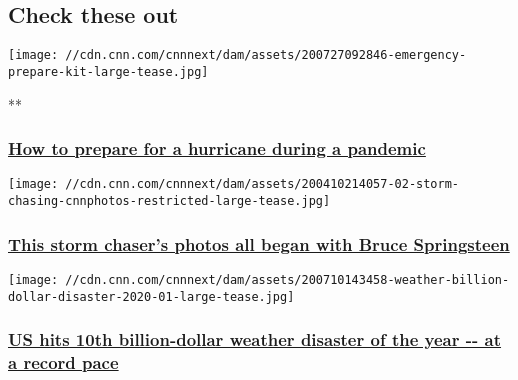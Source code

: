 \href{https://www.cnn.com/specials/weather/weather-video}{}

\hypertarget{check-these-out}{%
\subsection{Check these out}\label{check-these-out}}

\href{/videos/weather/2020/07/27/how-to-prepare-for-hurricane-during-coronavirus-pandemic-van-dillen-pkg-mxp-vpx.hln}{}

\texttt{[image: //cdn.cnn.com/cnnnext/dam/assets/200727092846-emergency-prepare-kit-large-tease.jpg]}

**

\hypertarget{how-to-prepare-for-a-hurricane-during-a-pandemic}{%
\subsubsection{\texorpdfstring{\href{/videos/weather/2020/07/27/how-to-prepare-for-hurricane-during-coronavirus-pandemic-van-dillen-pkg-mxp-vpx.hln}{How
to prepare for a hurricane during a
pandemic}}{How to prepare for a hurricane during a pandemic}}\label{how-to-prepare-for-a-hurricane-during-a-pandemic}}

\href{https://www.cnn.com/interactive/2020/04/weather/storm-chasing-eric-meola-cnnphotos/index.html}{}

\texttt{[image: //cdn.cnn.com/cnnnext/dam/assets/200410214057-02-storm-chasing-cnnphotos-restricted-large-tease.jpg]}

\hypertarget{this-storm-chasers-photos-all-began-with-bruce-springsteen}{%
\subsubsection{\texorpdfstring{\href{https://www.cnn.com/interactive/2020/04/weather/storm-chasing-eric-meola-cnnphotos/index.html}{This
storm chaser's photos all began with Bruce
Springsteen}}{This storm chaser's photos all began with Bruce Springsteen}}\label{this-storm-chasers-photos-all-began-with-bruce-springsteen}}

\href{/2020/07/12/weather/billion-dollar-weather-disasters-2020/index.html}{}

\texttt{[image: //cdn.cnn.com/cnnnext/dam/assets/200710143458-weather-billion-dollar-disaster-2020-01-large-tease.jpg]}

\hypertarget{us-hits-10th-billion-dollar-weather-disaster-of-the-year----at-a-record-pace}{%
\subsubsection{\texorpdfstring{\href{/2020/07/12/weather/billion-dollar-weather-disasters-2020/index.html}{US
hits 10th billion-dollar weather disaster of the year -\/- at a record
pace}}{US hits 10th billion-dollar weather disaster of the year -\/- at a record pace}}\label{us-hits-10th-billion-dollar-weather-disaster-of-the-year----at-a-record-pace}}

